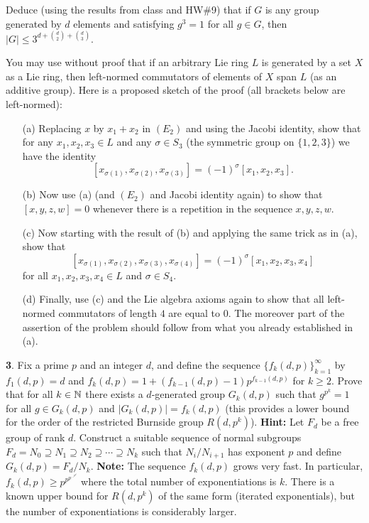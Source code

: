 \documentclass[12pt]{amsart}
\begin{document}
Deduce (using the results from class and HW\#9) that if $G$ is any group generated by $d$ elements and satisfying $g^3=1$ for all $g\in G$, then
$|G|\leq 3^{d+{d \choose 2}+{d\choose 3}}$.


You may use without proof that if an arbitrary Lie ring 
$L$ is generated by a set $X$ as a Lie ring, then left-normed commutators of elements of $X$ span $L$ (as an additive group).
Here is a proposed sketch of the proof (all brackets below are left-normed):
\begin{itemize}
\item[(a)] Replacing $x$ by $x_1+x_2$ in $(E_2)$ and using the Jacobi identity, show that for any $x_1,x_2,x_3\in L $
and any $\sigma\in S_3$ (the symmetric group on $\{1,2,3\}$) we have the identity 
$$[x_{\sigma(1)},x_{\sigma(2)},x_{\sigma(3)}]=(-1)^{\sigma}[x_1,x_2,x_3].$$
\item[(b)] Now use (a) (and $(E_2)$ and Jacobi identity again) to show that $[x,y,z,w]=0$ whenever there is a repetition in the sequence $x,y,z,w$.
\item[(c)] Now starting with the result of (b) and applying the same trick as in (a), show that 
$$[x_{\sigma(1)},x_{\sigma(2)},x_{\sigma(3)}, x_{\sigma(4)}]=(-1)^{\sigma}[x_1,x_2,x_3,x_4]$$ for all $x_1,x_2,x_3,x_4\in L$ and $\sigma\in S_4$.
\item[(d)] Finally, use (c) and the Lie algebra axioms again to show that all left-normed commutators of length $4$ are equal to $0$.
The moreover part of the assertion of the problem should follow from what you already established in (a).
\end{itemize}
\skv
{\bf 3}. Fix a prime $p$ and an integer $d$, and define the sequence $\{f_k(d,p)\}_{k=1}^{\infty}$ by $f_1(d,p)=d$ and
$f_{k}(d,p)=1+(f_{k-1}(d,p)-1)p^{f_{k-1}(d,p)}$ for $k\geq 2$. Prove that for all $k\in{\mathbb N}$ there exists a $d$-generated group $G_{k}(d,p)$ such that $g^{p^k}=1$ for all $g\in G_k(d,p)$ and $|G_k(d,p)|=f_k(d,p)$ (this provides a lower bound for the order of the restricted Burnside group $R(d,p^k)$). {\bf Hint:} Let $F_d$ be a free group of rank $d$. Construct a suitable sequence of normal subgroups $F_d=N_0\supseteq N_1\supseteq N_2\supseteq\cdots \supseteq N_k$ such that $N_i/N_{i+1}$ has exponent $p$ and define
$G_k(d,p)=F_d/N_k$.
\skv
{\bf Note:} The sequence $f_{k}(d,p)$ grows very fast. In particular, $f_k(d,p)\geq p^{p^{p^{\ldots^{p^d}}}}$ where the total number of exponentiations is $k$. There is a known upper bound for $R(d,p^k)$ of the same form (iterated exponentials), but the number of exponentiations is considerably larger.
  
\end{document}
